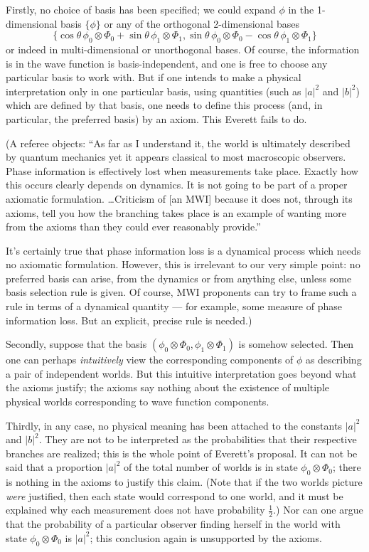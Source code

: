 \documentclass[aps,pra,12pt]{revtex4}
\begin{document}
Firstly, no choice of basis has been specified; we could expand $\phi$ in 
the 1-dimensional basis $\{ \phi \}$ or any of the orthogonal
2-dimensional bases 
\begin{equation}
\{ \cos \theta \, \phi_0 \otimes \Phi_0  + 
\sin \theta \, \phi_1 \otimes \Phi_1 ,
 \sin \theta \,  \phi_0 \otimes \Phi_0   - 
\cos \theta \, \phi_1 \otimes \Phi_1 \}
\end{equation}
or indeed in multi-dimensional or unorthogonal bases. 
Of course, the information is in 
the wave function is basis-independent, and one is free to choose any
particular basis to work with.  But if one intends to make a physical
interpretation only in one particular basis, using quantities (such
as $|a|^2$ and $|b|^2$) which are defined by that basis, one needs to
define this process (and, in particular, the preferred basis) by an
axiom. This Everett fails to do.  

(A referee objects: ``As far as I understand it, the world is ultimately
described by quantum mechanics yet it appears classical to most macroscopic
observers. Phase information is effectively lost when measurements take
place. Exactly how this occurs clearly depends on dynamics. It is not going
to be part of a proper axiomatic formulation. \ldots Criticism of [an MWI]
because it does not, through its axioms, tell you how the branching takes
place is an example of wanting more from the axioms than they could ever 
reasonably provide.'' 

It's certainly true that phase information 
loss is a dynamical process which needs no
axiomatic formulation. However, this is irrelevant to our very simple point: 
no preferred basis can arise, from the
dynamics or from anything else, unless some basis selection rule is given. 
Of course, MWI proponents can try to frame such a rule in terms of 
a dynamical quantity --- for example, some measure of phase information loss.
But an explicit, precise rule is needed.)

Secondly, suppose that the basis 
$(\phi_0 \otimes \Phi_0 , \phi_1 \otimes \Phi_1 )$ is somehow selected. 
Then one can perhaps {\em intuitively} 
view the corresponding components of $\phi$ 
as describing a pair of independent worlds. 
But this intuitive interpretation goes beyond what the axioms
justify; the axioms say nothing about the existence of multiple physical
worlds corresponding to wave function components. 

Thirdly, in any case, no physical meaning has been 
attached to the constants $|a|^2$ and $|b|^2$.  
They are not to be interpreted as the probabilities that their respective
branches are realized; this is the whole point of Everett's proposal. 
It can not be said that a proportion $|a|^2$ of the total number of worlds
is in state $\phi_0 \otimes \Phi_0$; there is nothing in the axioms to 
justify this claim. 
(Note that if the two worlds picture {\em were} justified, then each state 
would correspond to one world, and it must be explained why each measurement 
does not have probability $\frac{1}{2}$.)
Nor can one argue that the probability of a particular observer finding
herself in the world with state $\phi_0 \otimes \Phi_0$ is $|a|^2$; 
this conclusion again is unsupported by the axioms. 
\end{document}
